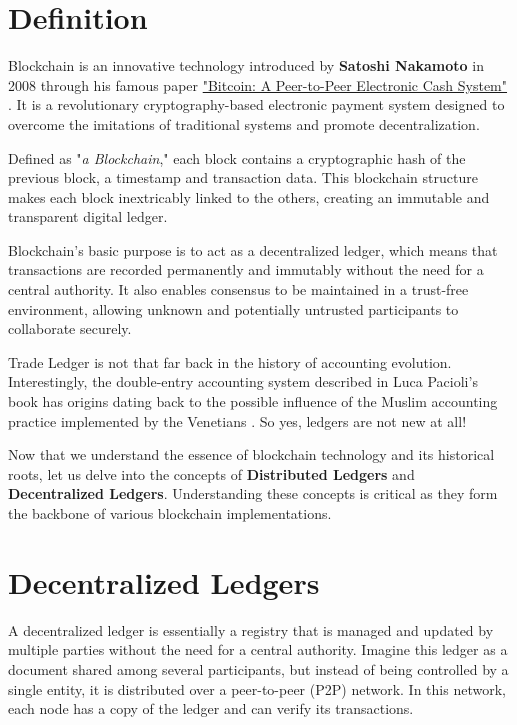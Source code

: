 \section{Definition}

Blockchain is an innovative technology introduced by \textbf{Satoshi Nakamoto} in 2008 through his famous paper \href{https://bitcoin.org/bitcoin.pdf}{"Bitcoin: A Peer-to-Peer Electronic Cash System"} \cite{bitcoinSatoshi}. It is a revolutionary cryptography-based electronic payment system designed to overcome the imitations of traditional systems and promote decentralization.

\begin{remark}
Defined as "\textit{a Blockchain}," each block contains a cryptographic hash of the previous block, a timestamp and transaction data. This blockchain structure makes each block inextricably linked to the others, creating an immutable and transparent digital ledger.
\end{remark}

Blockchain's basic purpose is to act as a decentralized ledger, which means that transactions are recorded permanently and immutably without the need for a central authority. It also enables consensus to be maintained in a trust-free environment, allowing unknown and potentially untrusted participants to collaborate securely.

Trade Ledger is not that far back in the history of accounting evolution. Interestingly, the double-entry accounting system described in Luca Pacioli's book has origins dating back to the possible influence of the Muslim accounting practice implemented by the Venetians \cite{accountingBooks}. So yes, ledgers are not new at all!

Now that we understand the essence of blockchain technology and its historical roots, let us delve into the concepts of \textbf{Distributed Ledgers} and \textbf{Decentralized Ledgers}. Understanding these concepts is critical as they form the backbone of various blockchain implementations.

\section{Decentralized Ledgers}
A decentralized ledger is essentially a registry that is managed and updated by multiple parties without the need for a central authority. Imagine this ledger as a document shared among several participants, but instead of being controlled by a single entity, it is distributed over a peer-to-peer (P2P) network. In this network, each node has a copy of the ledger and can verify its transactions.

